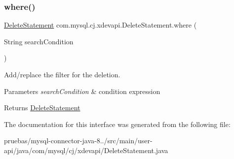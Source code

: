 \subsubsection{\texorpdfstring{where()}{where()}}
{\footnotesize\ttfamily \mbox{\hyperlink{interfacecom_1_1mysql_1_1cj_1_1xdevapi_1_1_delete_statement}{Delete\+Statement}} com.\+mysql.\+cj.\+xdevapi.\+Delete\+Statement.\+where (\begin{DoxyParamCaption}\item[{String}]{search\+Condition }\end{DoxyParamCaption})}

Add/replace the filter for the deletion.


\begin{DoxyParams}{Parameters}
{\em search\+Condition} & condition expression \\
\hline
\end{DoxyParams}
\begin{DoxyReturn}{Returns}
\mbox{\hyperlink{interfacecom_1_1mysql_1_1cj_1_1xdevapi_1_1_delete_statement}{Delete\+Statement}} 
\end{DoxyReturn}


The documentation for this interface was generated from the following file\+:\begin{DoxyCompactItemize}
\item 
pruebas/mysql-\/connector-\/java-\/8../src/main/user-\/api/java/com/mysql/cj/xdevapi/Delete\+Statement.\+java\end{DoxyCompactItemize}
